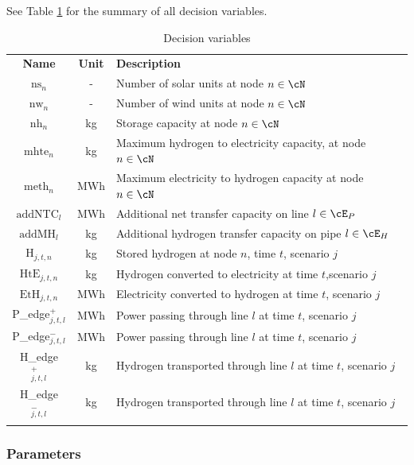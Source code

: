 See Table \ref{table_vars} for the summary of all decision variables.

\begin{table}
  \caption{Decision variables}
  \label{table_vars}
  \begin{tabularx}{\textwidth}{ccl}
  \hline\noalign{\smallskip}
  \textbf{Name} & \textbf{Unit} & \textbf{Description}  \\
  \noalign{\smallskip}\hline\noalign{\smallskip}
  $\text{ns}_n$ & - & Number of solar units at node $n \in \cN$ \\
  $\text{nw}_n$ & - & Number of wind units at node $n \in \cN$ \\
  $\text{nh}_n$ & kg & Storage capacity at node $n \in \cN$\\
  $\text{mhte}_n$ & kg & \parbox[t]{0.70\textwidth}{Maximum hydrogen to electricity capacity,  at node $n \in \cN$} \\
  $\text{meth}_n$ & MWh & Maximum electricity to hydrogen capacity at node $n \in \cN$\\
  $\text{addNTC}_l$ & MWh & Additional net transfer capacity on line $l\in\cE_P$\\
  $\text{addMH}_l$ & kg & Additional hydrogen transfer capacity on pipe $l\in\cE_H$\\
  \noalign{\smallskip}\hline\noalign{\smallskip}
  $\text{H}_{j,t,n}$ & kg& Stored hydrogen at node $n$, time \(t\), scenario \(j\)\\
  $\text{HtE}_{j,t,n}$ & kg& Hydrogen converted to electricity at time \(t\),scenario \(j\) \\
  $\text{EtH}_{j,t,n}$ & MWh& Electricity converted to hydrogen at time \(t\), scenario \(j\)\\
  P\_edge$^+_{j,t,l}$&MWh& Power passing through line $l$ at time $t$, scenario $j$ \\
  P\_edge$^-_{j,t,l}$&MWh& Power passing through line $l$ at time $t$, scenario $j$ \\
  H\_edge$^+_{j,t,l}$&kg& Hydrogen transported through line $l$ at time $t$, scenario $j$\\
  H\_edge$^-_{j,t,l}$&kg& Hydrogen transported through line $l$ at time $t$, scenario $j$\\
  \noalign{\smallskip}\hline
  \end{tabularx}
  \end{table}
  


\subsubsection{Parameters}

